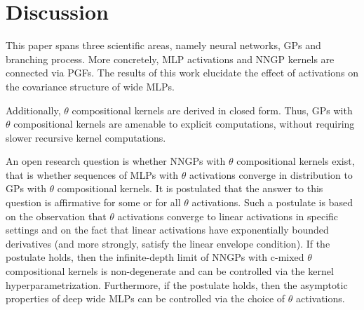 \documentclass[final, 12pt]{colt2021} %
\newtheorem{dfn}{Definition}
\begin{document}


\section{Discussion}
\label{discussion}

This paper spans three scientific areas,
namely neural networks, GPs and branching process.
More concretely,
MLP activations and NNGP kernels are connected via PGFs.
The results of this work elucidate the effect
of activations on the covariance structure of wide MLPs.

Additionally, $\theta$ compositional kernels
are derived in closed form.
Thus,
GPs with $\theta$ compositional kernels
are amenable to explicit computations,
without requiring slower
recursive kernel computations.

An open research question is whether
NNGPs with $\theta$ compositional kernels exist,
that is whether sequences of MLPs with $\theta$ activations
converge in distribution to GPs with $\theta$ compositional kernels.
It is postulated that the answer to this question is affirmative
for some or for all $\theta$ activations.
Such a postulate is based on the observation that
$\theta$ activations converge to linear activations
in specific settings and
on the fact that linear activations
have exponentially bounded derivatives
(and more strongly, satisfy the linear envelope condition).
If the postulate holds,
then the infinite-depth limit of
NNGPs with c-mixed $\theta$ compositional kernels
is non-degenerate and can be controlled via the kernel hyperparametrization.
Furthermore, if the postulate holds,
then the asymptotic properties of deep wide MLPs
can be controlled via the choice of $\theta$ activations.

\end{document}
